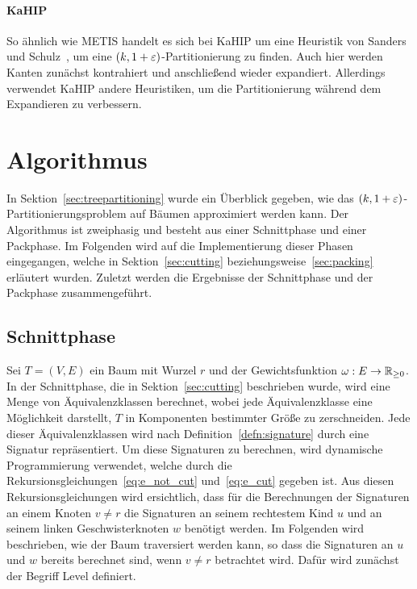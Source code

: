 \paragraph{KaHIP}
So ähnlich wie METIS handelt es sich bei KaHIP um eine Heuristik von Sanders und Schulz~\cite{SS13}, um eine $(k, 1 + \varepsilon)$\hyp Partitionierung zu finden.
Auch hier werden Kanten zunächst kontrahiert und anschließend wieder expandiert.
Allerdings verwendet KaHIP andere Heuristiken, um die Partitionierung während dem Expandieren zu verbessern.

\section{Algorithmus}\label{sec:algimpl}
In Sektion~\ref{sec:treepartitioning} wurde ein Überblick gegeben, wie das $(k,1+\varepsilon)$\hyp Partitionierungsproblem auf Bäumen approximiert werden kann. 
Der Algorithmus ist zweiphasig und besteht aus einer Schnittphase und einer Packphase.
Im Folgenden wird auf die Implementierung dieser Phasen eingegangen, welche in Sektion~\ref{sec:cutting} beziehungsweise~\ref{sec:packing} erläutert wurden.
Zuletzt werden die Ergebnisse der Schnittphase und der Packphase zusammengeführt.

\subsection{Schnittphase}\label{sec:cuttingimpl}
Sei $T=(V,E)$ ein Baum mit Wurzel $r$ und der Gewichtsfunktion $\omega : E \rightarrow \mathbb{R}_{\geq 0}$.
In der Schnittphase, die in Sektion~\ref{sec:cutting} beschrieben wurde, wird eine Menge von Äquivalenzklassen berechnet, wobei jede Äquivalenzklasse eine Möglichkeit darstellt, $T$ in Komponenten bestimmter Größe zu zerschneiden.
Jede dieser Äquivalenzklassen wird nach Definition~\ref{defn:signature} durch eine Signatur repräsentiert.
Um diese Signaturen zu berechnen, wird dynamische Programmierung verwendet, welche durch die Rekursionsgleichungen~\eqref{eq:e_not_cut} und~\eqref{eq:e_cut} gegeben ist.
Aus diesen Rekursionsgleichungen wird ersichtlich, dass für die Berechnungen der Signaturen an einem Knoten $v \neq r$ die Signaturen an seinem rechtestem Kind $u$ und an seinem linken Geschwisterknoten $w$ benötigt werden.
Im Folgenden wird beschrieben, wie der Baum traversiert werden kann, so dass die Signaturen an $u$ und $w$ bereits berechnet sind, wenn $v \neq r$ betrachtet wird. 
Dafür wird zunächst der Begriff Level definiert. \\

